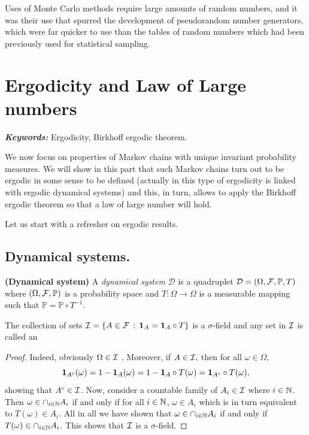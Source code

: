 \documentclass[english,graybox,envcountchap,envcountsame,sectrefs,shortlabels]{svmono}
\theoremstyle{style}
\newenvironment{svmultproof}{\small \begin{proof}}{\end{proof}}
\renewenvironment{keywords}{\textit{\bf Keywords: } \sffamily }{}
\newcommand{\bs}{\begin{shaded}}
\newcommand{\es}{\end{shaded}}
\begin{document}
\begin{subappendices}
Uses of Monte Carlo methods require large amounts of random numbers, and it was their use that spurred the development of pseudorandom number generators, which were far quicker to use than the tables of random numbers which had been previously used for statistical sampling.


\end{subappendices}

\chapter{Ergodicity and Law of Large numbers}
\minitoc
\begin{keywords}
Ergodicity, Birkhoff ergodic theorem.
\end{keywords}

We now focus on properties of Markov chains with unique invariant probability measures.
We will show in this part that such Markov chains turn out to be ergodic
in some sense to be defined (actually in this type of ergodicity is linked with ergodic dynamical systems) and this, in turn, allows to apply the
Birkhoff ergodic theorem so that a law of large number will hold.

Let us start with a refresher on ergodic results.

\section{Dynamical systems.}

\bs
\begin{definition}
\textbf{(Dynamical system)} A \emph{dynamical system} $\mathcal{D}$
is a quadruplet $\mathcal{D}=(\Omega,\mathcal{F},\mathbb{P},T)$ where $(\Omega,\mathcal{F},\mathbb{P})$
is a probability space and $T:\Omega\rightarrow\Omega$ is a measurable
mapping such that $\mathbb{P}=\mathbb{P}\circ T^{-1}$.
\end{definition}
\es
\begin{lemma}
The collection of sets $\mathcal{I}=\left\{ A\in\mathcal{F}\,:\,\mathbf{1}_{A}=\mathbf{1}_{A}\circ T\right\}$
is a $\sigma$-field and any set in $\mathcal{I}$ is called an  
\end{lemma}
\begin{svmultproof}
Indeed, obviously $\Omega\in\mathcal{I}$ . Moreover, if $A\in\mathcal{I},$ then
for all $\omega\in\Omega$,
\[
\mathbf{1}_{A^{c}}(\omega)=1-\mathbf{1}_{A}(\omega)=1-\mathbf{1}_{A}\circ T(\omega)=\mathbf{1}_{A^{c}}\circ T(\omega),
\]
showing that $A^{c}\in\mathcal{I}$. Now, consider a countable family of
$A_{i}\in\mathcal{I}$ where $i\in\mathbb{N}$. Then $\omega\in\cap_{i\in\mathbb{N}}A_{i}$
if and only if for all $i\in\mathbb{N}$, $\omega\in A_{i}$ which is in
turn equivalent to $T(\omega)\in A_{i}$. All in all we have shown
that $\omega\in\cap_{i\in\mathbb{N}}A_{i}$ if and only if $T(\omega)\in\cap_{i\in\mathbb{N}}A_{i}$.
This shows that $\mathcal{I}$ is a $\sigma$-field.
\end{svmultproof}
\end{document}
